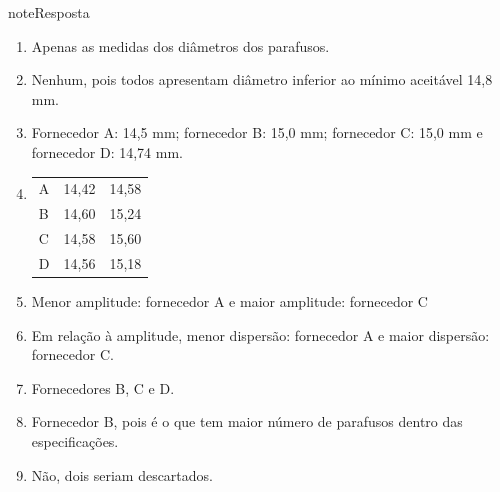 \begin{sphinxadmonition}{note}{Resposta}

\begin{enumerate}
\item {} 
Apenas as medidas dos diâmetros dos parafusos.

\item {} 
Nenhum, pois todos apresentam diâmetro inferior ao mínimo aceitável 14,8 mm.

\item {} 
Fornecedor A: 14,5 mm; fornecedor B: 15,0 mm; fornecedor C: 15,0 mm e fornecedor D: 14,74 mm.

\item {} 

\begin{savenotes}\sphinxattablestart
\centering
\begin{tabulary}{\linewidth}[t]{|T|T|T|}
\hline
{}\relax &\relax &\relax \\
\hline
A
&
14,42
&
14,58
\\
\hline
B
&
14,60
&
15,24
\\
\hline
C
&
14,58
&
15,60
\\
\hline
D
&
14,56
&
15,18
\\
\hline
\end{tabulary}
\par
\sphinxattableend\end{savenotes}

\item {} 
Menor amplitude: fornecedor A e maior amplitude: fornecedor C

\item {} 
Em relação à amplitude, menor dispersão: fornecedor A e maior dispersão: fornecedor C.

\item {} 
Fornecedores B, C e D.

\item {} 
Fornecedor B, pois é o que tem maior número de parafusos dentro das especificações.

\item {} 
Não, dois seriam descartados.

\end{enumerate}
\end{sphinxadmonition}


